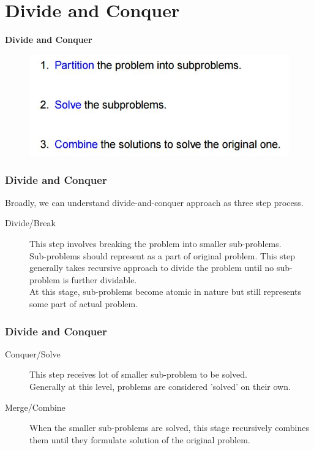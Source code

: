 \documentclass{beamer}
\begin{document}
\section{Divide and Conquer}
\begin{frame}
	\Large
	\noindent \textbf{Divide and Conquer}
	\begin{figure}
		\centering
		\includegraphics[width=0.9\linewidth]{divideandconquer}
		
	\end{figure}
	
\end{frame}
\begin{frame}
	\frametitle{Divide and Conquer}
	\large
	Broadly, we can understand divide-and-conquer approach as three step process.
	\begin{description}
		\item[Divide/Break] This step involves breaking the problem into smaller sub-problems. \\ Sub-problems should represent as a part of original problem. This step generally takes recursive approach to divide the problem until no sub-problem is further dividable. \\ At this stage, sub-problems become atomic in nature but still represents some part of actual problem.
	\end{description}
	
\end{frame}
\begin{frame}
	\frametitle{Divide and Conquer}
	\large
	\begin{description}
		\item[Conquer/Solve]
		This step receives lot of smaller sub-problem to be solved. \\ Generally at this level, problems are considered 'solved' on their own.
		\medskip
		\item[Merge/Combine]
		When the smaller sub-problems are solved, this stage recursively combines them until they formulate solution of the original problem.
	\end{description}
\end{frame}
\end{document}
